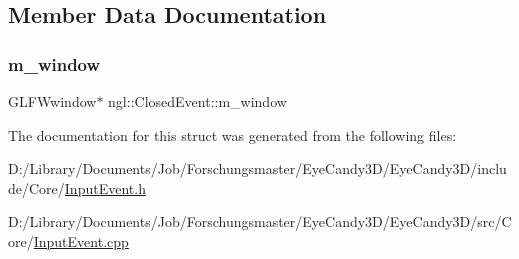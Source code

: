 \subsection{Member Data Documentation}
\mbox{\label{structngl_1_1_closed_event_a18bca3d4f9c90ed025f09d952854c5bc}} 
\subsubsection{\texorpdfstring{m\+\_\+window}{m\_window}}
{\footnotesize\ttfamily G\+L\+F\+Wwindow$\ast$ ngl\+::\+Closed\+Event\+::m\+\_\+window}



The documentation for this struct was generated from the following files\+:\begin{DoxyCompactItemize}
\item 
D\+:/\+Library/\+Documents/\+Job/\+Forschungsmaster/\+Eye\+Candy3\+D/\+Eye\+Candy3\+D/include/\+Core/\mbox{\hyperlink{_input_event_8h}{Input\+Event.\+h}}\item 
D\+:/\+Library/\+Documents/\+Job/\+Forschungsmaster/\+Eye\+Candy3\+D/\+Eye\+Candy3\+D/src/\+Core/\mbox{\hyperlink{_input_event_8cpp}{Input\+Event.\+cpp}}\end{DoxyCompactItemize}
